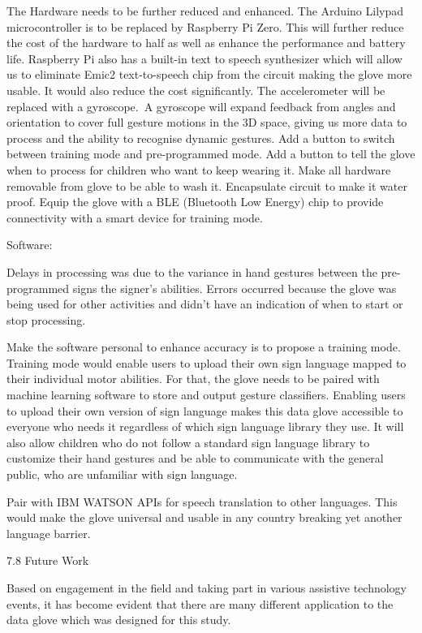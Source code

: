 The Hardware needs to be further reduced and enhanced. The Arduino Lilypad microcontroller is to be replaced by Raspberry Pi Zero. This will further reduce the cost of the hardware to half as well as enhance the performance and battery life. Raspberry Pi also has a built-in text to speech synthesizer which will allow us to eliminate Emic2 text-to-speech chip from the circuit making the glove more usable. It would also reduce the cost significantly. The accelerometer will be replaced with a gyroscope. A gyroscope will expand feedback from angles and orientation to cover full gesture motions in the 3D space, giving us more data to process and the ability to recognise dynamic gestures. Add a button to switch between training mode and pre-programmed mode. Add a button to tell the glove when to process for children who want to keep wearing it. Make all hardware removable from glove to be able to wash it. Encapsulate circuit to make it water proof. Equip the glove with a BLE (Bluetooth Low Energy) chip to provide connectivity with a smart device for training mode. 


Software: 

Delays in processing was due to the variance in hand gestures between the pre-programmed signs the signer’s abilities.  Errors occurred because the glove was being used for other activities and didn’t have an indication of when to start or stop processing. 

Make the software personal to enhance accuracy is to propose a training mode. Training mode would enable users to upload their own sign language mapped to their individual motor abilities. For that, the glove needs to be paired with machine learning software to store and output gesture classifiers. Enabling users to upload their own version of sign language makes this data glove accessible to everyone who needs it regardless of which sign language library they use. It will also allow children who do not follow a standard sign language library to customize their hand gestures and be able to communicate with the general public, who are unfamiliar with sign language. 

Pair with IBM WATSON APIs for speech translation to other languages. This would make the glove universal and usable in any country breaking yet another language barrier.

7.8 Future Work

Based on engagement in the field and taking part in various assistive technology events, it has become evident that there are many different application to the data glove which was designed for this study.

